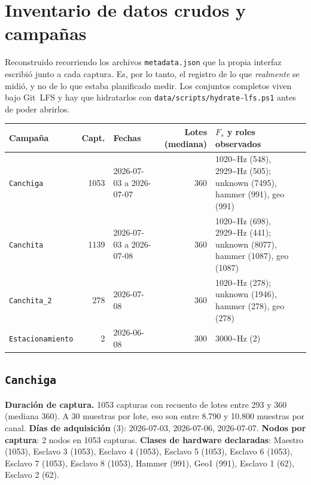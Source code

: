 \section{Inventario de datos crudos y campa\~nas}
\label{sec:inventario-datos}

Reconstruido recorriendo los archivos \texttt{metadata.json} que la
propia interfaz escribi\'o junto a cada captura. Es, por lo tanto, el registro de
lo que \emph{realmente} se midi\'o, y no de lo que estaba planificado medir. Los
conjuntos completos viven bajo Git~LFS y hay que hidratarlos con
\texttt{data/scripts/hydrate-lfs.ps1} antes de poder abrirlos.

\begin{center}\footnotesize
\begin{tabularx}{\textwidth}{@{}l r l r X@{}}
\toprule
Campa\~na & Capt. & Fechas & Lotes (mediana) & $F_s$ y roles observados \\
\midrule
\texttt{Canchiga} & 1053 & {\scriptsize 2026-07-03 a 2026-07-07} & 360 & {\scriptsize 1020\textasciitilde{}Hz (548), 2929\textasciitilde{}Hz (505); unknown (7495), hammer (991), geo (991)} \\
\texttt{Canchita} & 1139 & {\scriptsize 2026-07-03 a 2026-07-08} & 360 & {\scriptsize 1020\textasciitilde{}Hz (698), 2929\textasciitilde{}Hz (441); unknown (8077), hammer (1087), geo (1087)} \\
\texttt{Canchita\_2} & 278 & {\scriptsize 2026-07-08} & 360 & {\scriptsize 1020\textasciitilde{}Hz (278); unknown (1946), hammer (278), geo (278)} \\
\texttt{Estacionamiento} & 2 & {\scriptsize 2026-06-08} & 300 & {\scriptsize 3000\textasciitilde{}Hz (2)} \\
\bottomrule
\end{tabularx}
\end{center}

\subsection{\texttt{Canchiga}}
\textbf{Duraci\'on de captura.} 1053 capturas con recuento de lotes entre 293 y 360 (mediana 360). A 30 muestras por lote, eso son entre 8.790 y 10.800 muestras por canal.
\textbf{D\'ias de adquisici\'on} (3): 2026-07-03, 2026-07-06, 2026-07-07.
\textbf{Nodos por captura}: 2 nodos en 1053 capturas.
\textbf{Clases de hardware declaradas}: Maestro (1053), Esclavo 3 (1053), Esclavo 4 (1053), Esclavo 5 (1053), Esclavo 6 (1053), Esclavo 7 (1053), Esclavo 8 (1053), Hammer (991), Geo1 (991), Esclavo 1 (62), Esclavo 2 (62).

